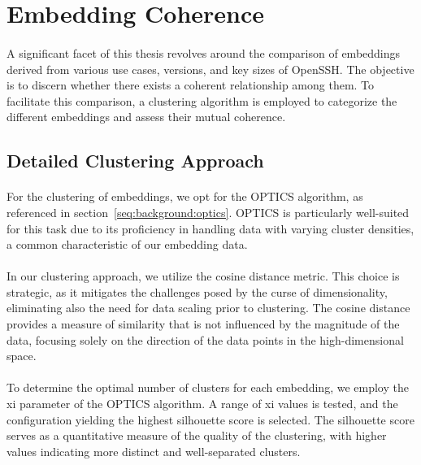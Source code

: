 \section{Embedding Coherence}\label{chap:embedding_coherence}
\paragraph{}A significant facet of this thesis revolves around the comparison of embeddings derived from various use cases, versions, and key sizes of OpenSSH. The objective is to discern whether there exists a coherent relationship among them. To facilitate this comparison, a clustering algorithm is employed to categorize the different embeddings and assess their mutual coherence.

\subsection{Detailed Clustering Approach}
    \paragraph{}For the clustering of embeddings, we opt for the OPTICS algorithm, as referenced in section~\ref{seq:background:optics}. OPTICS is particularly well-suited for this task due to its proficiency in handling data with varying cluster densities, a common characteristic of our embedding data.

    \paragraph{}In our clustering approach, we utilize the cosine distance metric. This choice is strategic, as it mitigates the challenges posed by the curse of dimensionality, eliminating also the need for data scaling prior to clustering. The cosine distance provides a measure of similarity that is not influenced by the magnitude of the data, focusing solely on the direction of the data points in the high-dimensional space.

    \paragraph{}To determine the optimal number of clusters for each embedding, we employ the xi parameter of the OPTICS algorithm. A range of xi values is tested, and the configuration yielding the highest silhouette score is selected. The silhouette score serves as a quantitative measure of the quality of the clustering, with higher values indicating more distinct and well-separated clusters.

